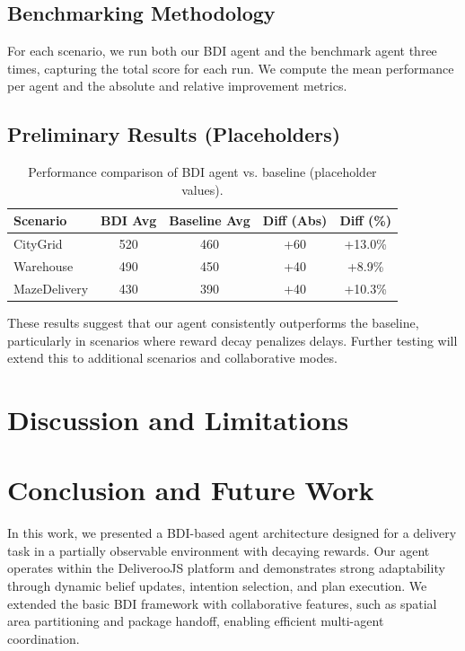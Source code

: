 \documentclass[conference]{IEEEtran}
\begin{document}
\subsection{Benchmarking Methodology}

For each scenario, we run both our BDI agent and the benchmark agent three times, capturing the total score for each run. We compute the mean performance per agent and the absolute and relative improvement metrics.

\subsection{Preliminary Results (Placeholders)}

\begin{table}[htbp]
	\centering
	\caption{Performance comparison of BDI agent vs. baseline (placeholder values).}
	\begin{tabular}{|l|c|c|c|c|}
		\hline
		\textbf{Scenario} & \textbf{BDI Avg} & \textbf{Baseline Avg} & \textbf{Diff (Abs)} & \textbf{Diff (\%)} \\
		\hline
		CityGrid & 520 & 460 & +60 & +13.0\% \\
		Warehouse & 490 & 450 & +40 & +8.9\% \\
		MazeDelivery & 430 & 390 & +40 & +10.3\% \\
		\hline
	\end{tabular}
	\label{tab:benchmark-results}
\end{table}

These results suggest that our agent consistently outperforms the baseline, particularly in scenarios where reward decay penalizes delays. Further testing will extend this to additional scenarios and collaborative modes.

\section{Discussion and Limitations}


\section{Conclusion and Future Work}

In this work, we presented a BDI-based agent architecture designed for a delivery task in a partially observable environment with decaying rewards. Our agent operates within the DeliverooJS platform and demonstrates strong adaptability through dynamic belief updates, intention selection, and plan execution. We extended the basic BDI framework with collaborative features, such as spatial area partitioning and package handoff, enabling efficient multi-agent coordination.
\end{document}
